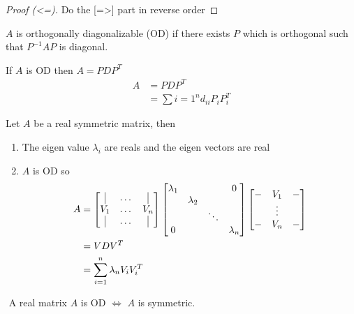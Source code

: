 \documentclass[12pt]{article}
\begin{document}
\begin{proof}[Proof (<=)]
	Do the [=>] part in reverse order
\end{proof}
\begin{definition}
	$A$ is orthogonally diagonalizable (OD) if there exists $P$ which is orthogonal such that $P^{-1}AP$ is diagonal.
\end{definition}
\begin{claim}
	If $A$ is OD then $A=PDP^T$
	\begin{align*}
	A &= PDP^T\\
	&=\sum{i=1}^n d_{ii}P_iP_i^T
	\end{align*}
\end{claim}
\begin{theorem}
	$ $\\
	Let $A$ be a real symmetric matrix, then
	\begin{enumerate}
		\item The eigen value $\lambda_i$ are reals and the eigen vectors are real
		\item $A$ is OD so \\
		\begin{align*}
		A &= \left[
		\begin{matrix}
		\vline &\dots&\vline\\
		V_1 & \dots& V_n\\
		\vline &\dots&\vline\\
		\end{matrix}
		\right]
		\left[
		\begin{matrix}
		\lambda_1 & &  & 0\\
		& \lambda_2& &	\\
		&  & \ddots &\\
		0 & & & \lambda_n
		\end{matrix}
		\right]
		\left[
		\begin{matrix}
		- &V_1&-\\
		&\vdots& \\
		-&V_n&-
		\end{matrix}
		\right]\\
		&= VDV^T\\
		&=\sum_{i=1}^n\lambda_n V_iV_i^T
		\end{align*}
	\end{enumerate}
\end{theorem}

\begin{theorem}
	$ $ \newline A real matrix $A$ is OD $\iff$ $A$ is symmetric.
\end{theorem}
\end{document}
